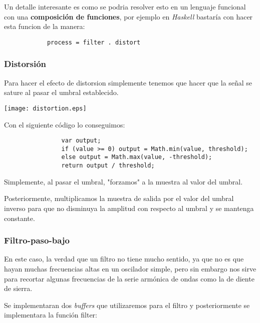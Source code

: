 \documentclass[a4paper]{article}
\begin{document}
            Un detalle interesante es como se podria resolver esto
            en un lenguaje funcional con una \textbf{composición
            de funciones}, por ejemplo en \textit{Haskell} bastaría con
            hacer esta funcion de la manera:

            \begin{verbatim}
            process = filter . distort
            \end{verbatim}



            \subsubsection{Distorsión}
                Para hacer el efecto de distorsion simplemente tenemos
                que hacer que la señal se sature al pasar el umbral
                establecido.

                \texttt{[image: distortion.eps]}

                Con el siguiente código lo
                conseguimos:

                \begin{verbatim}
                var output;
                if (value >= 0) output = Math.min(value, threshold);
                else output = Math.max(value, -threshold);
                return output / threshold;
                \end{verbatim}

                Simplemente, al pasar el umbral, "forzamos" a la
                muestra al valor del umbral.

                Posteriormente, multiplicamos la muestra de salida
                por el valor del umbral inverso para que no disminuya
                la amplitud con respecto al umbral y se mantenga
                constante.

            \subsubsection{Filtro-paso-bajo}
                En este caso, la verdad que un filtro no tiene
                mucho sentido, ya que no es que hayan muchas
                frecuencias altas en un oscilador simple, pero
                sin embargo nos sirve para recortar algunas
                frecuencias de la serie armónica de ondas como
                la de diente de sierra.

                Se implementaran dos \textit{buffers} que
                utilizaremos para el filtro y posteriormente
                se implementara la función filter:
\end{document}
